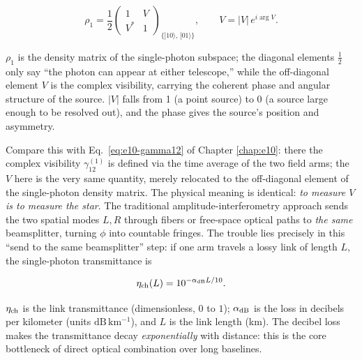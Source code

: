 \begin{equation}
  \rho_1
  =
  \frac{1}{2}
  \begin{pmatrix}
  1 & V\\[2pt]
  V^* & 1
  \end{pmatrix}_{\{|10\rangle,\,|01\rangle\}} ,
  \qquad
  V=|V|\,e^{i\arg V}.
  \label{eq:e24-single-photon-density}
\end{equation}
\begin{formulaexplain}
\(\rho_1\) is the density matrix of the single-photon subspace; the diagonal elements \(\tfrac12\) only say ``the photon can appear at either telescope,'' while the off-diagonal element \(V\) is the complex visibility, carrying the coherent phase and angular structure of the source. \(|V|\) falls from 1 (a point source) to 0 (a source large enough to be resolved out), and the phase gives the source's position and asymmetry.
\end{formulaexplain}

Compare this with Eq.\ \eqref{eq:e10-gamma12} of Chapter \ref{chap:e10}: there the complex visibility \(\gamma^{(1)}_{12}\) is defined via the time average of the two field arms; the \(V\) here is the very same quantity, merely relocated to the off-diagonal element of the single-photon density matrix. The physical meaning is identical: \emph{to measure \(V\) is to measure the star}. The traditional amplitude-interferometry approach sends the two spatial modes \(L,R\) through fibers or free-space optical paths to \emph{the same} beamsplitter, turning \(\phi\) into countable fringes. The trouble lies precisely in this ``send to the same beamsplitter'' step: if one arm travels a lossy link of length \(L\), the single-photon transmittance is

\begin{equation}
  \eta_{\rm ch}(L)=10^{-\alpha_{\rm dB}L/10}.
  \label{eq:e24-link-loss}
\end{equation}
\begin{formulaexplain}
\(\eta_{\rm ch}\) is the link transmittance (dimensionless, \(0\) to \(1\)); \(\alpha_{\rm dB}\) is the loss in decibels per kilometer (units \(\mathrm{dB\,km^{-1}}\)), and \(L\) is the link length (km). The decibel loss makes the transmittance decay \emph{exponentially} with distance: this is the core bottleneck of direct optical combination over long baselines.
\end{formulaexplain}

